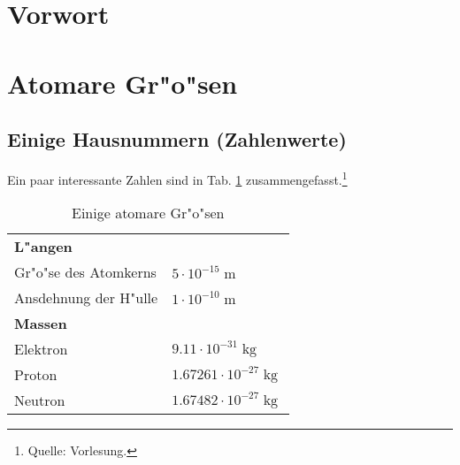 \documentclass[a4paper,draft]{article}
\begin{document}

\section*{Vorwort}


\tableofcontents
\clearpage %



\section{Atomare Gr"o"sen}\label{sec:atomare_grosen}

\subsection{Einige Hausnummern (Zahlenwerte)}
\label{sec:einige_hausnummern_zahlenwerte}

Ein paar interessante Zahlen sind in Tab. \ref{tab:hausnummern}
zusammengefasst.\footnote{Quelle: Vorlesung.}
\begin{table}[h]
  \centering
  \begin{tabular}{l l}
    \toprule
\textbf{L"angen} \\
Gr"o"se des Atomkerns & $5 \cdot 10^{-15}\operatorname{m}$\\
Ansdehnung der H"ulle & $1 \cdot 10^{-10}\operatorname{m}$\\
\midrule
\textbf{Massen}\\
Elektron & $9.11 \cdot 10^{-31}\operatorname{kg}$\\
Proton & $1.67261 \cdot 10^{-27}\operatorname{kg}$\\
Neutron & $1.67482 \cdot 10^{-27}\operatorname{kg}$\\
\bottomrule
  \end{tabular}
  \caption{Einige atomare Gr"o"sen}
  \label{tab:hausnummern}
\end{table}
\end{document}

